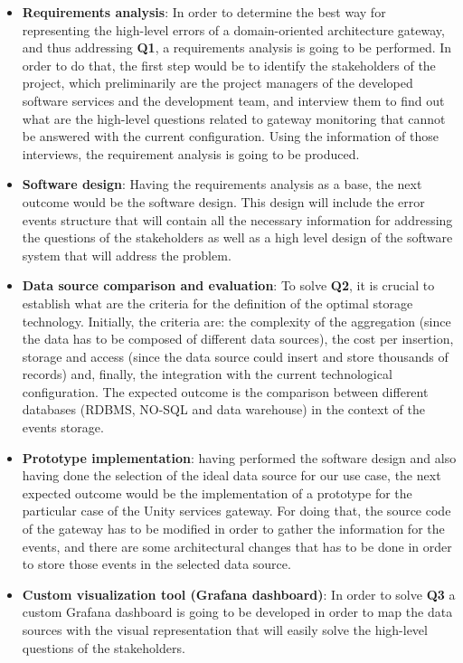 \documentclass[12pt]{article}
\begin{document}
\begin{itemize}
    \item \textbf{Requirements analysis}: In order to determine the best way for representing the high-level errors of a domain-oriented architecture gateway, and thus addressing \textbf{Q1}, a requirements analysis is going to be performed. In order to do that, the first step would be to identify the stakeholders of the project, which preliminarily are the project managers of the developed software services and the development team, and interview them to find out what are the high-level questions related to gateway monitoring that cannot be answered with the current configuration. Using the information of those interviews, the requirement analysis is going to be produced.
    \item \textbf{Software design}: Having the requirements analysis as a base, the next outcome would be the software design. This design will include the error events structure that will contain all the necessary information for addressing the questions of the stakeholders as well as a high level design of the software system that will address the problem.
    \item \textbf{Data source comparison and evaluation}: To solve \textbf{Q2}, it is crucial to establish what are the criteria for the definition of the optimal storage technology. Initially, the criteria are: the complexity of the aggregation (since the data has to be composed of different data sources), the cost per insertion, storage and access (since the data source could insert and store thousands of records) and, finally, the integration with the current technological configuration. The expected outcome is the comparison between different databases (RDBMS, NO-SQL and data warehouse) in the context of the events storage.
    \item \textbf{Prototype implementation}: having performed the software design and also having done the selection of the ideal data source for our use case, the next expected outcome would be the implementation of a prototype for the particular case of the Unity services gateway. For doing that, the source code of the gateway has to be modified in order to gather the information for the events, and there are some architectural changes that has to be done in order to store those events in the selected data source.
    \item \textbf{Custom visualization tool (Grafana dashboard)}: In order to solve \textbf{Q3} a custom Grafana dashboard is going to be developed in order to map the data sources with the visual representation that will easily solve the high-level questions of the stakeholders.
\end{itemize}



\end{document}
